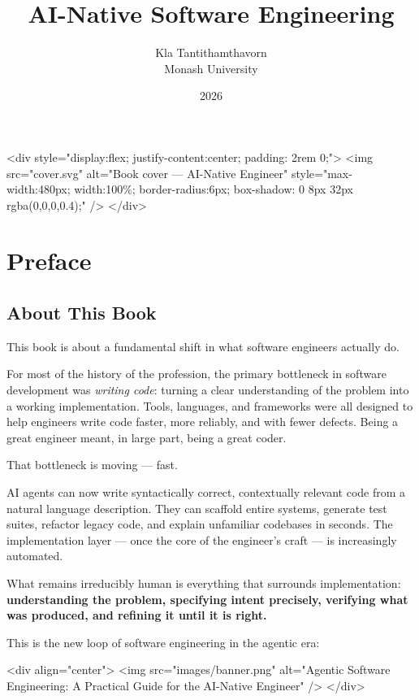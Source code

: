 \documentclass[11pt,a4paper]{book}
\title{AI-Native Software Engineering}
\author{Kla Tantithamthavorn \\ Monash University}
\date{2026}
\begin{document}
\frontmatter
\maketitle
\tableofcontents

\mainmatter


<div style="display:flex; justify-content:center; padding: 2rem 0;">
  <img src="cover.svg" alt="Book cover --- AI-Native Engineer" style="max-width:480px; width:100\%; border-radius:6px; box-shadow: 0 8px 32px rgba(0,0,0,0.4);" />
</div>

\chapter{Preface}

\section{About This Book}

This book is about a fundamental shift in what software engineers actually do.

For most of the history of the profession, the primary bottleneck in software development was \textit{writing code}: turning a clear understanding of the problem into a working implementation. Tools, languages, and frameworks were all designed to help engineers write code faster, more reliably, and with fewer defects. Being a great engineer meant, in large part, being a great coder.

That bottleneck is moving --- fast.

AI agents can now write syntactically correct, contextually relevant code from a natural language description. They can scaffold entire systems, generate test suites, refactor legacy code, and explain unfamiliar codebases in seconds. The implementation layer --- once the core of the engineer's craft --- is increasingly automated.

What remains irreducibly human is everything that surrounds implementation: \textbf{understanding the problem, specifying intent precisely, verifying what was produced, and refining it until it is right.}

This is the new loop of software engineering in the agentic era:

<div align="center">
  <img src="images/banner.png" alt="Agentic Software Engineering: A Practical Guide for the AI-Native Engineer" />
</div>
\end{document}
